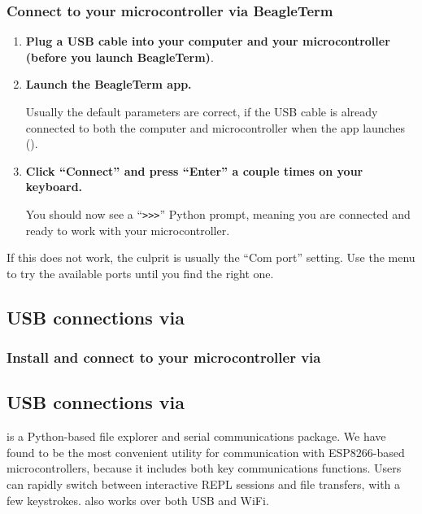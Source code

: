 \subsubsection{\howto{} Connect to your microcontroller via BeagleTerm}
\begin{enumerate}
	\item \textbf{Plug a USB cable into your computer and your microcontroller (before you launch BeagleTerm)}.
	\item \textbf{Launch the BeagleTerm app.}

	Usually the default parameters are correct, if the USB cable is already connected to both the computer and microcontroller when the app launches ().
	\item \textbf{Click ``Connect'' and press ``Enter'' a couple times on your keyboard.}

	You should now see a ``\verb|>>>|'' Python prompt, meaning you are connected and ready to work with your microcontroller.
\end{enumerate}
If this does not work, the culprit is usually the ``Com port'' setting.
Use the menu to try the available ports until you find the right one.

\subsection{\color{gray}USB connections via \thonny \color{black}}

\subsubsection{\color{gray}\howto{} Install and connect to your microcontroller via \thonny \color{black}}





\subsection{USB connections via \mpfshell}
\mpfshell is a Python-based file explorer and serial communications package.
We have found \mpfshell to be the most convenient utility for communication with ESP8266-based microcontrollers, because it includes both key communications functions.
Users can rapidly switch between interactive REPL sessions and file transfers, with a few keystrokes.
\mpfshell also works over both USB and WiFi.


